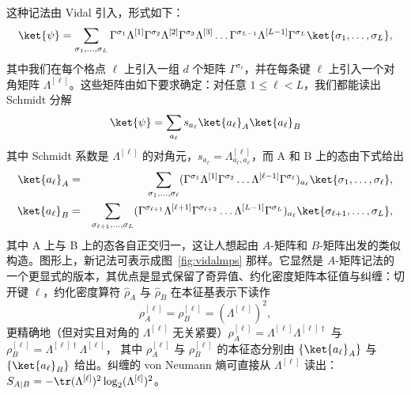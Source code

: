 这种记法由 Vidal\cite{Vidal03a} 引入，形式如下：
\begin{equation}
\ket{\psi} = \sum_{\sigma_1,\ldots,\sigma_L} \Gamma^{\sigma_1} \Lambda^{[1]}  \Gamma^{\sigma_2} \Lambda^{[2]}  \Gamma^{\sigma_3} \Lambda^{[3]} \ldots  \Gamma^{\sigma_{L-1}} \Lambda^{[L-1]}  \Gamma^{\sigma_L} \ket{\sigma_1,\ldots,\sigma_L} ,
\label{eq:canonicalform}
\end{equation} 
其中我们在每个格点 $\ell$ 上引入一组 $d$ 个矩阵 $\Gamma^{\sigma_\ell}$，并在每条键 $\ell$ 上引入一个对角矩阵 $\Lambda^{[\ell]}$。这些矩阵由如下要求确定：对任意 $1\leq \ell < L$，我们都能读出 Schmidt 分解
\begin{equation}
\ket{\psi} = \sum_{a_\ell} s_{a_\ell} \ket{a_\ell}_A \ket{a_\ell}_B
\end{equation}
其中 Schmidt 系数是 $\Lambda^{[\ell]}$ 的对角元，$s_{a_\ell} = \Lambda^{[\ell]}_{a_\ell,a_\ell}$，而 A 和 B 上的态由下式给出
\begin{eqnarray}
\ket{a_\ell}_A &=& \sum_{\sigma_1,\ldots,\sigma_\ell}
 (\Gamma^{\sigma_1}\Lambda^{[1]}\Gamma^{\sigma_2} \ldots \Lambda^{[\ell-1]} \Gamma^{\sigma_\ell})_{a_{\ell}}
\ket{\sigma_1,\ldots,\sigma_\ell}, \\
\ket{a_\ell}_B &=& \sum_{\sigma_{\ell+1},\ldots,\sigma_L} 
(\Gamma^{\sigma_{\ell+1}}\Lambda^{[\ell+1]}\Gamma^{\sigma_{\ell+2}} \ldots \Lambda^{[L-1]} \Gamma^{\sigma_L})_{a_\ell}
\ket{\sigma_{\ell+1},\ldots,\sigma_L},
\end{eqnarray}
其中 A 上与 B 上的态各自正交归一，这让人想起由 $A$-矩阵和 $B$-矩阵出发的类似构造。图形上，新记法可表示成图~\ref{fig:vidalmps} 那样。它显然是 $A$-矩阵记法的一个更显式的版本，其优点是显式保留了奇异值、约化密度矩阵本征值与纠缠：切开键 $\ell$，约化密度算符 $\hat{\rho}_A$ 与 $\hat{\rho}_B$ 在本征基表示下读作
\begin{equation}
\rho_A^{[\ell]} = \rho_B^{[\ell]} = (\Lambda^{[\ell]})^2 ,
\end{equation}
更精确地（但对实且对角的 $\Lambda^{[\ell]}$ 无关紧要）$\rho_A^{[\ell]} = \Lambda^{[\ell]}\Lambda^{[\ell]\dagger}$ 与 $\rho_B^{[\ell]} = \Lambda^{[\ell]\dagger}\Lambda^{[\ell]}$，
其中 $\rho_A^{[\ell]}$ 与 $\rho_B^{[\ell]}$ 的本征态分别由 $\{ \ket{a_\ell}_A \}$ 与 $\{ \ket{a_\ell}_B \}$ 给出。纠缠的 von Neumann 熵可直接从 $\Lambda^{[\ell]}$ 读出：$S_{A|B} = -\tr (\Lambda^{[\ell]})^2 \log_2 (\Lambda^{[\ell]})^2$。

